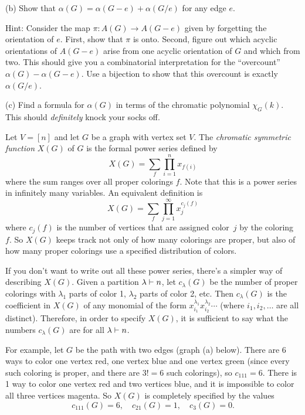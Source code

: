 (b) Show that $\alpha(G)=\alpha(G-e)+\alpha(G/e)$ for any edge $e$.

Hint: Consider the map $\pi:A(G)\to A(G-e)$ given by forgetting the orientation of $e$.  First, show that $\pi$ is onto.  Second, figure out which acyclic orientations of $A(G-e)$ arise from one acyclic orientation of $G$ and which from two.  This should give you a combinatorial interpretation for the ``overcount'' $\alpha(G)-\alpha(G-e)$.  Use a bijection to show that this overcount is exactly $\alpha(G/e)$.

(c) Find a formula for $\alpha(G)$ in terms of the chromatic polynomial $\chi_G(k)$.
This should \emph{definitely} knock your socks off.

\prob
Let $V=[n]$ and let $G$ be a graph with vertex set $V$.
The \emph{chromatic symmetric function} $X(G)$ of $G$ is the formal power series
defined by
\[X(G) = \sum_f \prod_{i=1}^n x_{f(i)}\]
where the sum ranges over all proper colorings $f$.  Note that this is a power series in infinitely many variables.  An equivalent definition is
\[X(G) = \sum_f \prod_{j=1}^\infty x_j^{c_j(f)}\]
where $c_j(f)$ is the number of vertices that are assigned color~$j$ by the coloring~$f$.  So $X(G)$ keeps track not only of how many colorings are proper, but also of how many proper colorings use a specified distribution of colors.

If you don't want to write out all these power series, there's a simpler way of describing $X(G)$.  Given a partition $\lambda\vdash n$, let $c_\lambda(G)$ be the number of proper colorings with $\lambda_1$ parts of color 1, $\lambda_2$ parts of color 2, etc.  Then $c_\lambda(G)$ is the coefficient in $X(G)$ of any monomial of the form $x_{i_1}^{\lambda_1}x_{i_2}^{\lambda_2}\cdots$ (where $i_1,i_2,\dots$ are all distinct).  Therefore, in order to specify $X(G)$, it is sufficient to say what the numbers $c_\lambda(G)$ are for all $\lambda\vdash n$.

For example, let $G$ be the path with two edges (graph (a) below).  There are
6 ways to color one vertex red, one vertex blue and one vertex green (since every such coloring is proper, and there are $3!=6$ such colorings), so $c_{111}=6$.
There is 1 way to color one vertex red and two vertices blue, and it is impossible to color all three vertices magenta.  So $X(G)$ is completely specified by the values
\[c_{111}(G)=6, \quad c_{21}(G)=1,\quad c_{3}(G)=0.\]


